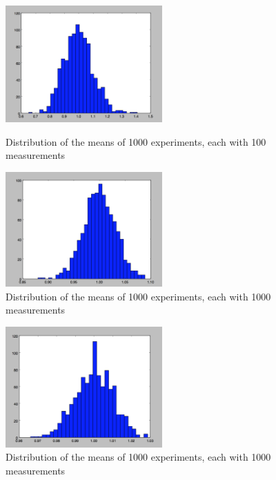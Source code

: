 \documentclass[12pt]{article}
\begin{document}
\clearpage

\begin{figure}[ht]
	\centering
	\begin{minipage}[b]{0.47\linewidth}
		\includegraphics[width = 6cm]{ex N=100.png}
		\caption{Distribution of the means of 1000 experiments, each with 100 measurements}
		\label{fig:minipage1}
	\end{minipage}
	\quad
	\begin{minipage}[b]{0.47\linewidth}
		\includegraphics[width = 6cm]{ex N=1000.png}
		\caption{Distribution of the means of 1000 experiments, each with 1000 measurements}
		\label{fig:minipage2}
	\end{minipage}
\end{figure}

\begin{figure}[ht]
	\centering
	\begin{minipage}[b]{0.5\linewidth}
		\includegraphics[width = 6cm]{ex N=10000.png}
		\caption{Distribution of the means of 1000 experiments, each with 1000 measurements}
		\label{fig:minipage1}
	\end{minipage}
	\quad
\end{figure}
\end{document}

